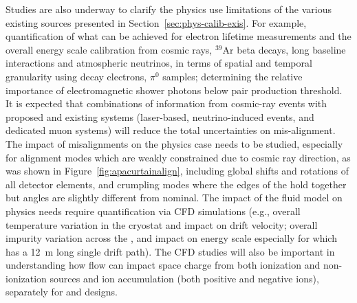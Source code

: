 
Studies are also underway to clarify the physics use limitations of the various existing sources presented in Section~\ref{sec:phys-calib-exis}. For example, quantification of what can be achieved for  electron lifetime measurements and the overall energy scale calibration from cosmic rays, ${}^{39}$Ar beta decays, long baseline interactions and atmospheric neutrinos, in terms of spatial and temporal granularity using decay electrons, $\pi^0$ samples; determining the relative importance of electromagnetic shower photons below pair production threshold. It is expected that combinations of information from cosmic-ray events with proposed and existing systems (laser-based, neutrino-induced events, and dedicated muon systems) will reduce the total uncertainties on mis-alignment.  The impact of misalignments on the physics case needs to be studied, especially for alignment modes which are weakly constrained due to cosmic ray direction, as was shown in Figure~\ref{fig:apacurtainalign}, including global shifts and rotations of all detector elements, and crumpling modes where the edges of the  hold together but angles are slightly different from nominal. The impact of the fluid model on physics needs require quantification via CFD simulations (e.g., overall temperature variation in the cryostat and impact on drift velocity; overall impurity variation across the \detmodule{}, and impact on energy scale especially for  which has a \SI{12}{\m} long single drift path). The CFD studies will also be important in understanding how \lar flow can impact space charge from both ionization and non-ionization sources and ion accumulation (both positive and negative ions), separately for  and  designs. 



